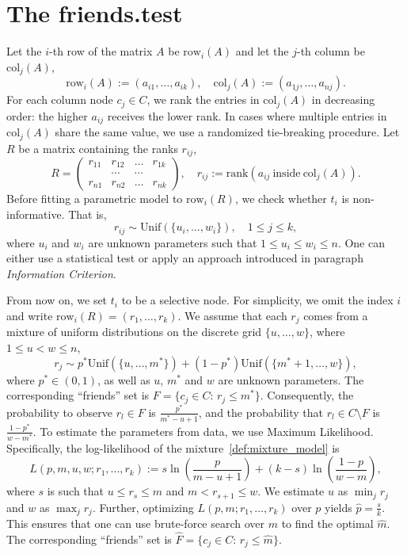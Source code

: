 \documentclass{llncs}
\begin{document}
\section{The \textsf{friends.test}}
\label{sec:method}
Let the $i$-th row of the matrix $A$ be $\text{row}_i(A)$ and let the $j$-th column be $\text{col}_j(A)$,
\[
\text{row}_i(A) := (a_{i1}, \dots, a_{ik}),
\quad
\text{col}_j(A) := (a_{1j}, \dots, a_{nj}).
\]
For each column node $c_j \in C$, we rank the entries in $\text{col}_j(A)$ in decreasing order: the higher $a_{ij}$ receives the lower rank. In cases where multiple entries in $\text{col}_j(A)$ share the same value, we use a randomized tie-breaking procedure. Let $R$ be a matrix containing the ranks $r_{ij}$, 
\begin{equation*}
R = \begin{pmatrix}
r_{11} & r_{12} & \dots & r_{1k} \\
 &\cdots & \cdots & \\
r_{n1} & r_{n2} & \dots & r_{nk}
\end{pmatrix}, 
\quad
r_{ij} :=\text{rank}\left(a_{ij}~ \text{inside}~\text{col}_j(A)\right).
\end{equation*}
Before fitting a parametric model to $\text{row}_i(R)$, we check whether $t_i$ is non-informative. That is,
\[
r_{ij} \sim \text{Unif}(\{u_i, \dots, w_i\}), \quad 1 \le j \le k,
\]
where $u_i$ and $w_i$ are unknown parameters such that $1\le u_i \le w_i \le n$. One can either use a statistical test or apply an approach introduced in paragraph \textit{Information Criterion}. 

From now on, we set $t_i$ to be a selective node. For simplicity, we omit the index $i$ and write $
\text{row}_{i}(R) = (r_{1}, \dots, r_{k})$. We assume that each $r_j$ comes from a mixture of uniform distributions on the discrete grid $\{u, \dots, w\}$, where $1\le u < w \le n$,
\begin{equation}
\label{def:mixture_model}
r_j \sim p^* \text{Unif}\left(\{u, \dots, m^*\}\right) + (1-p^*)\text{Unif}\left(\{m^{*}+1, \dots, w\}\right),
\end{equation}
where $p^* \in (0, 1)$, as well as $u$, $m^*$ and $w$ are unknown parameters. The corresponding ``friends'' set is
$F = \{c_j\in C:\, r_{j} \le m^*\}$. Consequently, the probability to observe $r_l \in F$ is $\frac{p^{*}}{m^* - u + 1}$, and the probability that $r_l \in C\setminus F$ is $\frac{1 - p^{*}}{w - m^*}$.
To estimate the parameters from data, we use Maximum Likelihood. Specifically, the log-likelihood of the mixture~\eqref{def:mixture_model} is
\[
L(p, m, u, w; r_1, \dots, r_k) := s\ln\left(\frac{p}{m-u+1}\right) + (k-s)\ln\left(\frac{1-p}{w - m}\right),
\]
where $ s$ is such that $u \le r_{s} \le m$ and $m < r_{s+1} \le w$. We estimate $u$ as $\min_{j} r_j$ and $w$ as $\max_{j} r_j$. Further, optimizing $L(p, m; r_1, \dots, r_k)$ over $p$ yields $\hat{p} = \frac{s}{k}$. This ensures that one can use brute-force search over $m$ to find the optimal $\hat{m}$. The corresponding ``friends'' set is $\hat{F} = \{c_j \in C:\, r_j \le \hat{m} \}$.
\end{document}
